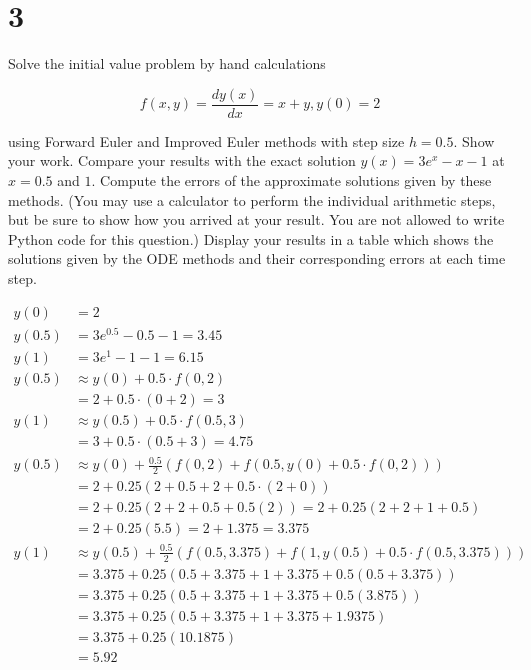 \documentclass[11pt]{article}
\begin{document}
\section{3}

Solve the initial value problem by hand calculations

\[ f(x, y) = \dfrac{dy(x)}{dx} = x + y, y(0) = 2 \]

using Forward Euler and Improved Euler methods with step size $h = 0.5$. Show your work. Compare your results with the exact solution $y(x) = 3e^x - x - 1$ at $x = 0.5$ and $1$. Compute the errors of the approximate solutions given by these methods. (You may use a calculator to perform the individual arithmetic steps, but be sure to show how you arrived at your result. You are not allowed to write Python code for this question.) Display your results in a table which shows the solutions given by the ODE methods and their corresponding errors at each time step.

\begin{align*}
  y(0) &= 2 \\
  y(0.5) &= 3e^{0.5} - 0.5 - 1 = 3.45 \\
  y(1) &= 3e^1 - 1 - 1 = 6.15 \\
  y(0.5) &\approx y(0) + 0.5 \cdot f(0, 2) \\
  &= 2 + 0.5 \cdot (0 + 2) = 3 \\
  y(1) &\approx y(0.5) + 0.5 \cdot f(0.5, 3) \\
  &= 3 + 0.5 \cdot (0.5 + 3) = 4.75 \\
  y(0.5) &\approx y(0) + \frac{0.5}{2} \left( f(0, 2) + f(0.5, y(0) + 0.5 \cdot f(0, 2)) \right) \\
  &= 2 + 0.25 (2 + 0.5 + 2 + 0.5 \cdot (2 + 0)) \\
  &= 2 + 0.25 (2 + 2 + 0.5 + 0.5 (2)) = 2 + 0.25 (2 + 2 + 1 + 0.5) \\
  &= 2 + 0.25 (5.5) = 2 + 1.375 = 3.375 \\
  y(1) &\approx y(0.5) + \frac{0.5}{2} \left( f(0.5, 3.375) + f(1, y(0.5) + 0.5 \cdot f(0.5, 3.375)) \right) \\
  &= 3.375 + 0.25 (0.5 + 3.375 + 1 + 3.375 + 0.5 (0.5 + 3.375)) \\
  &= 3.375 + 0.25 (0.5 + 3.375 + 1 + 3.375 + 0.5 (3.875)) \\
  &= 3.375 + 0.25 (0.5 + 3.375 + 1 + 3.375 + 1.9375) \\
  &= 3.375 + 0.25 (10.1875) \\
  &= 5.92 \\
\end{align*}
\end{document}
